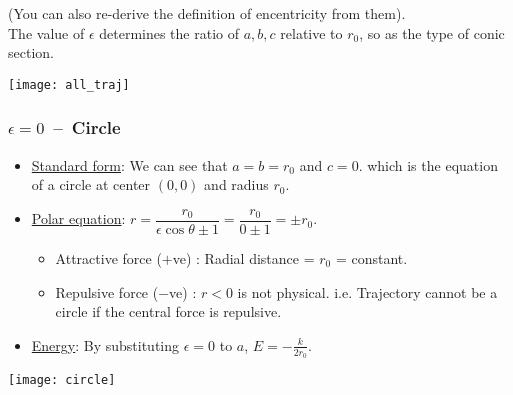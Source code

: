 \documentclass[class=article, crop=false, 12pt]{standalone}
\begin{document}

(You can also re-derive the definition of encentricity from them).\\

The value of $\epsilon$ determines the ratio of $a,b,c$ relative to $r_0$, 
so as the type of conic section. 

\begin{center}
    \begin{minipage}{0.8\linewidth}
        \centering
        \texttt{[image: all\_traj]}
    \end{minipage}
\end{center}


\newpage
\subsubsection{$\epsilon = 0$ \,--\, Circle}

\begin{itemize}
       
    \item \ul{Standard form}: We can see that $a=b=r_0$ and $c=0$. 
    which is the equation of a circle at center $(0,0)$ and radius $r_0$.

    \item \ul{Polar equation}: $r=\dfrac{r_0}{\epsilon\cos\theta \pm 1} = \dfrac{r_0}{0 \pm 1} = \pm r_0$. 
    \begin{itemize}
        \item Attractive force ($+$ve) : Radial distance = $r_0$ = constant.
        \item Repulsive force ($-$ve) : $r<0$ is not physical. 
        i.e. Trajectory cannot be a circle if the central force is repulsive.
    \end{itemize}
    
    \item \ul{Energy}: By substituting $\epsilon=0$ to $a$, $\boxed{E=-\frac{k}{2r_0}}$.
\end{itemize}
\begin{center}
    \begin{minipage}{0.8\linewidth}
        \centering
        \texttt{[image: circle]}
    \end{minipage}
\end{center}
\end{document}
